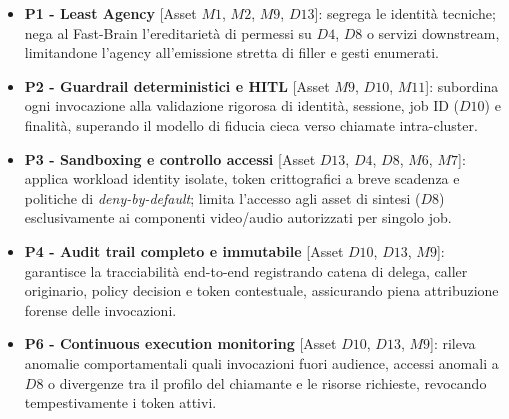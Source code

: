 \documentclass[11pt,a4paper]{article}
\begin{document}
\begin{itemize}
    \item \textbf{P1 - Least Agency} [Asset $M1$, $M2$, $M9$, $D13$]:
    segrega le identità tecniche; nega al Fast-Brain l'ereditarietà di permessi su $D4$, $D8$ o servizi downstream, limitandone l'agency all'emissione stretta di filler e gesti enumerati.

    \item \textbf{P2 - Guardrail deterministici e HITL} [Asset $M9$, $D10$, $M11$]:
    subordina ogni invocazione alla validazione rigorosa di identità, sessione, job ID ($D10$) e finalità, superando il modello di fiducia cieca verso chiamate intra-cluster.

    \item \textbf{P3 - Sandboxing e controllo accessi} [Asset $D13$, $D4$, $D8$, $M6$, $M7$]:
    applica workload identity isolate, token crittografici a breve scadenza e politiche di \emph{deny-by-default}; limita l'accesso agli asset di sintesi ($D8$) esclusivamente ai componenti video/audio autorizzati per singolo job.

    \item \textbf{P4 - Audit trail completo e immutabile} [Asset $D10$, $D13$, $M9$]:
    garantisce la tracciabilità end-to-end registrando catena di delega, caller originario, policy decision e token contestuale, assicurando piena attribuzione forense delle invocazioni.

    \item \textbf{P6 - Continuous execution monitoring} [Asset $D10$, $D13$, $M9$]:
    rileva anomalie comportamentali quali invocazioni fuori audience, accessi anomali a $D8$ o divergenze tra il profilo del chiamante e le risorse richieste, revocando tempestivamente i token attivi.


\end{itemize}
\end{document}
